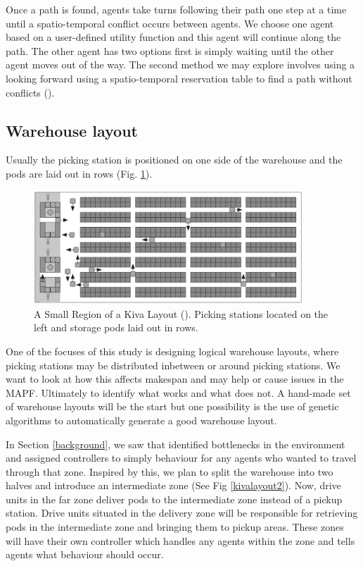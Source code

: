 \documentclass[a4paper,11pt]{article}
\begin{document}
Once a path is found, agents take turns following their path one step at a time until a spatio-temporal conflict occurs between agents. We choose one agent based on a user-defined utility function and this agent will continue along the path. The other agent has two options first is simply waiting until the other agent moves out of the way. The second method we may explore involves using a looking forward using a spatio-temporal reservation table to find a path without conflicts (\cite{wilt2014spatially}).

\subsection{Warehouse layout}
\label{warehouselayout}
Usually the picking station is positioned on one side of the warehouse and the pods are laid out in rows (Fig. \ref{kivalayout1}).

\begin{figure}[h]
	\centering
	\includegraphics[width=0.9\textwidth]{graphics/kivasystemlayout}
	\caption{A Small Region of a Kiva Layout (\cite{wurman2008coordinating}). Picking stations located on the left and storage pods laid out in rows.}
	\label{kivalayout1}
\end{figure}

One of the focuses of this study is designing logical warehouse layouts, where picking stations may be distributed inbetween or around picking stations. We want to look at how this affects makespan and may help or cause issues in the MAPF. Ultimately to identify what works and what does not. A hand-made set of warehouse layouts will be the start but one possibility is the use of genetic algorithms to automatically generate a good warehouse layout.

In Section \ref{background}, we saw that \cite{wilt2014spatially} identified bottlenecks in the environment and assigned controllers to simply behaviour for any agents who wanted to travel through that zone. Inspired by this, we plan to split the warehouse into two halves and introduce an intermediate zone (See Fig \ref{kivalayout2}). Now, drive units in the far zone deliver pods to the intermediate zone instead of a pickup station. Drive units situated in the delivery zone will be responsible for retrieving pods in the intermediate zone and bringing them to pickup areas. These zones will have their own controller which handles any agents within the zone and tells agents what behaviour should occur.
\end{document}
